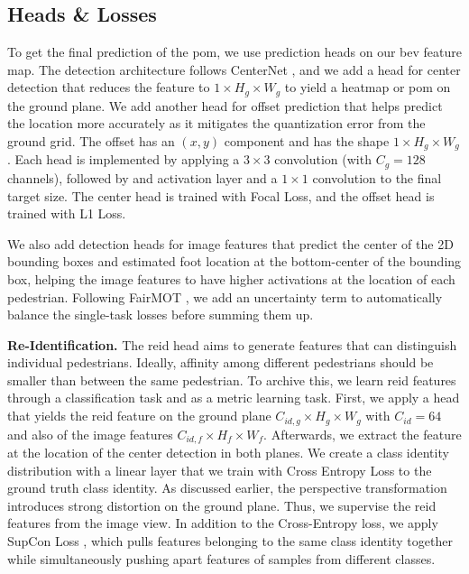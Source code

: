 \documentclass[10pt,twocolumn,letterpaper]{article}
\newcommand{\nparagraph}[1]{\noindent\textbf{#1.  }}
\begin{document}
\subsection{Heads \& Losses}
To get the final prediction of the \gls{pom}, we use prediction heads on our \gls{bev} feature map. The detection architecture follows CenterNet \cite{zhou2019objects}, and we add a head for center detection that reduces the feature to $1 \times H_g \times W_g$ to yield a heatmap or \gls{pom} on the ground plane. We add another head for offset prediction that helps predict the location more accurately as it mitigates the quantization error from the ground grid. The offset has an $(x,y)$ component and has the shape  $1 \times H_g \times W_g$. Each head is implemented by applying a $3 \times 3$ convolution (with $C_g = 128$ channels), followed by and activation layer and a $1 \times 1$ convolution to the final target size. The center head is trained with Focal Loss, and the offset head is trained with L1 Loss.

We also add detection heads for image features that predict the center of the 2D bounding boxes and estimated foot location at the bottom-center of the bounding box, helping the image features to have higher activations at the location of each pedestrian.
Following FairMOT \cite{zhang2021fairmot}, we add an uncertainty term to automatically balance the single-task losses before summing them up.

\nparagraph{Re-Identification}
The \gls{reid} head aims to generate features that can distinguish individual pedestrians. Ideally, affinity among different pedestrians should be smaller than between the same pedestrian. To archive this, we learn \gls{reid} features through a classification task and as a metric learning task. First, we apply a head that yields the \gls{reid} feature on the ground plane $C_{id, g} \times H_g \times W_g$ with $C_{id} = 64$ and also of the image features $C_{id, f} \times H_f \times W_f$. Afterwards, we extract the feature at the location of the center detection in both planes. We create a class identity distribution with a linear layer that we train with Cross Entropy Loss to the ground truth class identity. As discussed earlier, the perspective transformation introduces strong distortion on the ground plane. Thus, we supervise the \gls{reid} features from the image view. In addition to the Cross-Entropy loss, we apply SupCon Loss \cite{khosla2020supervised}, which pulls features belonging to the same class identity together while simultaneously pushing apart features of samples from different classes.
\end{document}
